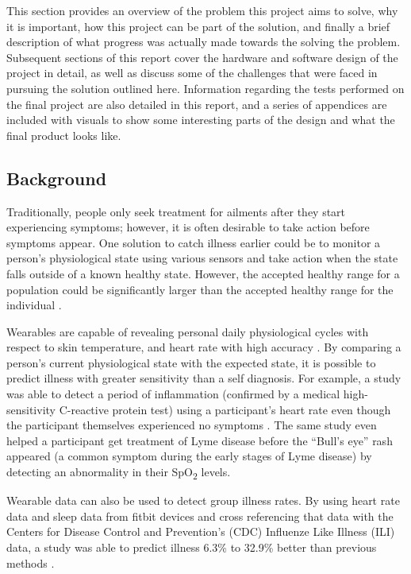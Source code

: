 This section provides an overview of the problem this project aims to solve,
why it is important, how this project can be part of the solution, and finally 
a brief description of what progress was actually made towards the solving the 
problem. Subsequent sections of this report cover the hardware and software design 
of the project in detail, as well as discuss some of the challenges that
were faced in pursuing the solution outlined here. Information regarding the
tests performed on the final project are also detailed in this report, and a
series of appendices are included with visuals to show some interesting parts 
of the design and what the final product looks like.

\subsection{Background}

Traditionally, people only seek treatment for ailments after they start
experiencing symptoms; however, it is often desirable to take action before
symptoms appear.  One solution to catch illness earlier could be to monitor a
person's physiological state using various sensors and take action when the
state falls outside of a known healthy state.  However, the accepted healthy
range for a population could be significantly larger than the accepted healthy
range for the individual \cite{Wearable-tracking2017}.

Wearables are capable of revealing personal daily physiological cycles with
respect to skin temperature, and heart rate with high accuracy
\cite{Wearable-tracking2017}. By comparing a person's current physiological
state with the expected state, it is possible to predict illness with greater
sensitivity than a self diagnosis. For example, a study was able to detect a
period of inflammation (confirmed by a medical high-sensitivity C-reactive
protein test) using a participant's heart rate even though the participant
themselves experienced no symptoms \cite{Wearable-tracking2017}.  The same
study even helped a participant get treatment of Lyme disease before the
``Bull's eye'' rash appeared (a common symptom during the early stages of Lyme
disease) by detecting an abnormality in their SpO\textsubscript{2} levels.

Wearable data can also be used to detect group illness rates.  By using heart
rate data and sleep data from fitbit devices and cross referencing that data
with the Centers for Disease Control and Prevention's (CDC) Influenze Like
Illness (ILI) data, a study was able to predict illness 6.3\% to 32.9\% better
than previous methods \cite{Radin2020}.

